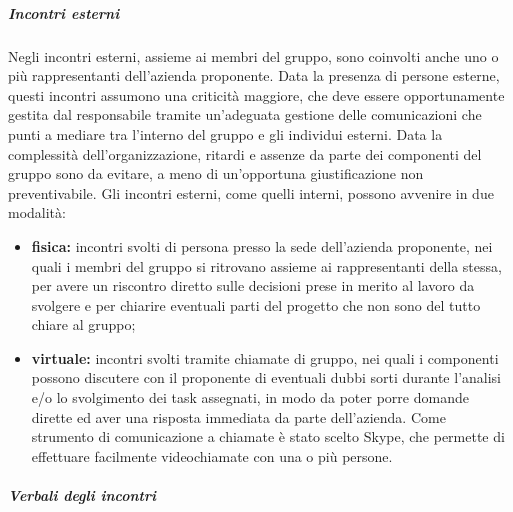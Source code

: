 			\subparagraph{Incontri esterni}

				Negli incontri esterni, assieme ai membri del gruppo, sono coinvolti anche uno o più rappresentanti dell'azienda proponente.
				\newline
				Data la presenza di persone esterne, questi incontri assumono una criticità maggiore, che deve essere opportunamente gestita dal responsabile tramite un'adeguata gestione delle comunicazioni che punti a mediare tra l'interno del gruppo e gli individui esterni.
				\newline
				Data la complessità dell'organizzazione, ritardi e assenze da parte dei componenti del gruppo sono da evitare, a meno di un'opportuna giustificazione non preventivabile.\newline
				Gli incontri esterni, come quelli interni, possono avvenire in due modalità:
				\begin{itemize}
					\item \textbf{fisica:} incontri svolti di persona presso la sede dell'azienda proponente, nei quali i membri del gruppo si ritrovano assieme ai rappresentanti della stessa, per avere un riscontro diretto sulle decisioni prese in merito al lavoro da svolgere e per chiarire eventuali parti del progetto che non sono del tutto chiare al gruppo;
					\item \textbf{virtuale:} incontri svolti tramite chiamate di gruppo, nei quali i componenti possono discutere con il proponente di eventuali dubbi sorti durante l'analisi e/o lo svolgimento dei task assegnati, in modo da poter porre domande dirette ed aver una risposta immediata da parte dell'azienda.
					\newline
					Come strumento di comunicazione a chiamate è stato scelto Skype, che permette di effettuare facilmente videochiamate con una o più persone.
				\end{itemize}

			\subparagraph{Verbali degli incontri}

